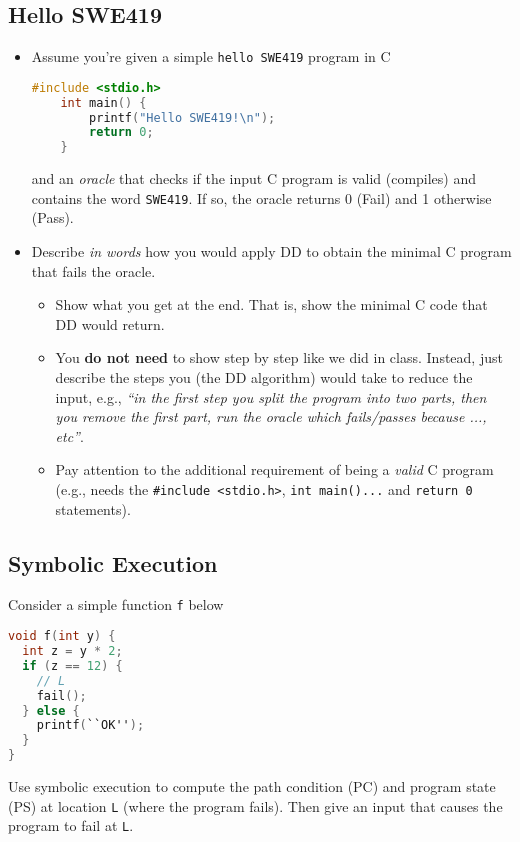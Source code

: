 \documentclass[oneside,11pt,dvipsnames]{book}
\newcommand{\code}[1]{\texttt{#1}}
\begin{document}
\subsection{Hello SWE419}\label{exercise:hello-swe419}
\begin{itemize}
    \item Assume you're given a simple \code{hello SWE419} program in C
    \begin{lstlisting}[language=C]
    #include <stdio.h>
    int main() {
        printf("Hello SWE419!\n");
        return 0;
    }
    \end{lstlisting}
    and an \emph{oracle} that checks if the input C program is valid (compiles) and contains the word \code{SWE419}. If so, the oracle returns 0 (Fail) and 1 otherwise (Pass).
    \item Describe \emph{in words} how you would apply DD to obtain the minimal C program that fails the oracle.
    \begin{itemize}
        \item Show what you get at the end. That is, show the minimal C code that DD would return.  
        \item You \textbf{do not need} to show step by step like we did in class. Instead, just describe the steps you (the DD algorithm) would take to reduce the input,  e.g., \emph{``in the first step you split the program into two parts, then you remove the first part, run the oracle which fails/passes because ..., etc''}.
        \item Pay attention to the additional requirement of being a \emph{valid} C program (e.g., needs the \code{\#include <stdio.h>}, \code{int main()...} and \code{return 0} statements). 
    \end{itemize}    
\end{itemize}

\subsection{Symbolic Execution}\label{exercise:symbolic-execution}

Consider a simple function \code{f} below 

\begin{lstlisting}[language=C]
void f(int y) {
  int z = y * 2;
  if (z == 12) {
    // L
    fail();
  } else {
    printf(``OK'');
  }
}
\end{lstlisting}

Use symbolic execution to compute the path condition (PC) and program state (PS) at location \code{L} (where the program fails). Then give an input that causes the program to fail at \code{L}.
\end{document}
